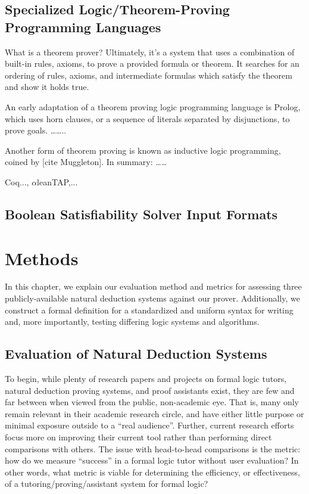 \documentclass[ms]{uncgdissertationexp2}
\theoremstyle{plain}
\theoremstyle{definition}
\theoremstyle{remark}
\begin{document}
\section{Specialized Logic/Theorem-Proving Programming Languages}
What is a theorem prover? Ultimately, it's a system that uses a combination of built-in rules, axioms, to prove a provided formula or theorem. It searches for an ordering of rules, axioms, and intermediate formulas which satisfy the theorem and show it holds true. 

An early adaptation of a theorem proving logic programming language is Prolog, which uses horn clauses, or a sequence of literals separated by disjunctions, to prove goals. ……..

Another form of theorem proving is known as inductive logic programming, coined by [cite Muggleton]. In summary: ……

Coq..., $\alpha$\textsf{lean}TAP,...
\section{Boolean Satisfiability Solver Input Formats} 
\chapter{Methods}
In this chapter, we explain our evaluation method and metrics for assessing three publicly-available natural deduction systems against our prover. Additionally, we construct a formal definition for a standardized and uniform syntax for writing and, more importantly, testing differing logic systems and algorithms.

\section{Evaluation of Natural Deduction Systems}
To begin, while plenty of research papers and projects on formal logic tutors, natural deduction proving systems, and proof assistants exist, they are few and far between when viewed from the public, non-academic eye. That is, many only remain relevant in their academic research circle, and have either little purpose or minimal exposure outside to a ``real audience''. Further, current research efforts focus more on improving their current tool rather than performing direct comparisons with others. The issue with head-to-head comparisons is the metric: how do we measure ``success'' in a formal logic tutor without user evaluation? In other words, what metric is viable for determining the efficiency, or effectiveness, of a tutoring/proving/assistant system for formal logic?
\end{document}
